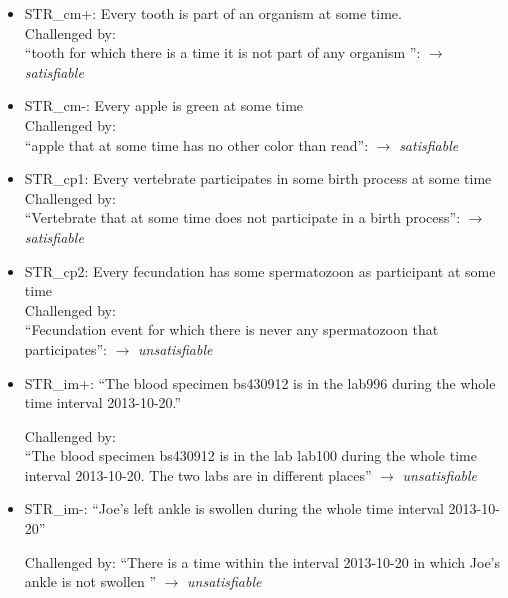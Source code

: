  
\begin{itemize}
\item STR\_cm+: Every tooth is part of an organism at some time. \\
Challenged by: 
\\ ``tooth for which there is a time it is not part of any organism '': 
$\rightarrow$ \emph{satisfiable} \\


\item STR\_cm-: Every apple is green at some time
\\
Challenged by: 
\\
``apple that at some time has no other color than read'': 
$\rightarrow$ \emph{satisfiable} 


\item STR\_cp1: Every vertebrate participates in some birth process at some time\\
Challenged by: \\  
``Vertebrate that at some time does not participate in a birth process'': 
$\rightarrow$ \emph{satisfiable} 



\item STR\_cp2: Every fecundation has some spermatozoon as participant at some time
\\
Challenged by: \\ 
``Fecundation event for which there is never any spermatozoon that participates'': 
$\rightarrow$ \emph{unsatisfiable} \\

\item STR\_im+: ``The blood specimen bs430912 is in the lab996 during the whole time interval 2013-10-20.'' 


Challenged by: \\ ``The blood specimen bs430912 is in the lab lab100 during the whole time interval 2013-10-20. The two labs are in different places'' 
$\rightarrow$ \emph{unsatisfiable}



\item STR\_im-: ``Joe's left ankle is swollen during the whole time interval 2013-10-20''


Challenged by: 
``There is a time within the interval 2013-10-20 in which Joe's ankle is not swollen '' 
$\rightarrow$ \emph{unsatisfiable}




\end{itemize}
